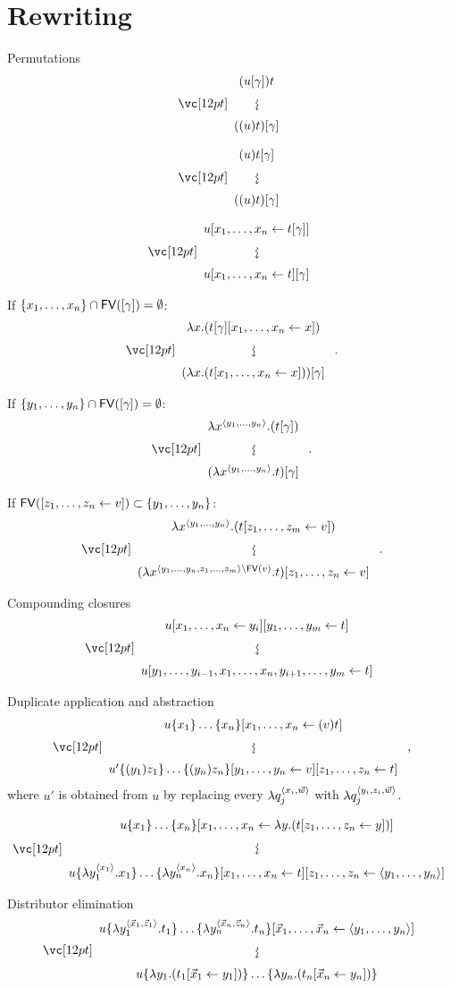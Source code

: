 \documentclass{amsart}
\begin{document}
\section*{Rewriting}

\noindent
Permutations
\[
\displayrewrite
{ (u\g)t }
{ ((u)t)\g }
\]

\bigskip

\[
\displayrewrite
{ (u)t\g }
{ ((u)t)\g }
\]

\[
\displayrewrite
{ u\share x{t\g} }
{ u\share xt\g }
\]

\noindent
If $\{\vv x\}\cap\FV(\g)=\emptyset$:
\[
\displayrewrite
{ \lambda x.(t\g\share xx)}
{ (\lambda x. (t\share xx)) \g }\;.
\]

\noindent
If $\{\vv y\}\cap\FV(\g)=\emptyset$:
\[
\displayrewrite
{ \lambda x^{\tup y}.(t\g) }
{ (\lambda x^{\tup y}.t)\g }\;.
\]

\noindent
If $\FV(\share zv)\subset\{\vv y\}$:
\[
\displayrewrite
{ \lambda x^{\tup y}.(t\share[m] zv) }
{ (\lambda x^{\tup*{y_1,\dots,y_n,z_1,\dots,z_m} \setminus \FV(v)}.t)\share zv }\;.
\]

\bigskip
\bigskip
\bigskip

\noindent
Compounding closures
\[
\displayrewrite
{ u\share x{y_i}\share[m] yt }
{ u\share* {y_1, \dotsc, y_{i-1}, \vv x, y_{i+1}, \dotsc, y_m}t }
\]

\bigskip
\bigskip
\bigskip

\noindent
Duplicate application and abstraction
\[
\displayrewrite
{ u\cxt*{x_1}\ldots\cxt*{x_n}\share x{(v)t} }
{ u'\cxt*{(y_1)z_1}\dots\cxt*{(y_n)z_n}\share yv\share zt }\;,
\]
where $u'$ is obtained from $u$ by replacing every $\lambda
q_j^{\tup*{x_i,\vv*w}}$ with $\lambda q_j^{\tup*{y_i,z_i,\vv*w}}$.

\bigskip

\[
\displayrewrite
{ u\cxt*{x_1}\ldots\cxt*{x_n}\share x{\lambda y.(t\share zy)} }
{ u\cxt*{\lambda y_1^{\tup*{x_1}}.x_1}\ldots\cxt*{\lambda
  y_n^{\tup*{x_n}}.x_n}\share xt\share z{\tup y} }
\]

\bigskip
\bigskip
\bigskip

\noindent
Distributor elimination
\[
\displayrewrite
{ u\cxt* {\lambda y_1^{\tup*{\vv*x_1,\vv*z_1}}.t_1}\ldots\cxt* {\lambda
y_n^{\tup*{\vv*x_n,\vv*z_n}}.t_n}\share* {\vv*x_1,\dots,\vv*x_n}{\tup y} }
{ u\cxt* {\lambda y_1.(t_1\share* {\vv*x_1}{y_1})}\ldots\cxt* {\lambda
y_n.(t_n\share* {\vv*x_n}{y_n})} }
\]
\end{document}
